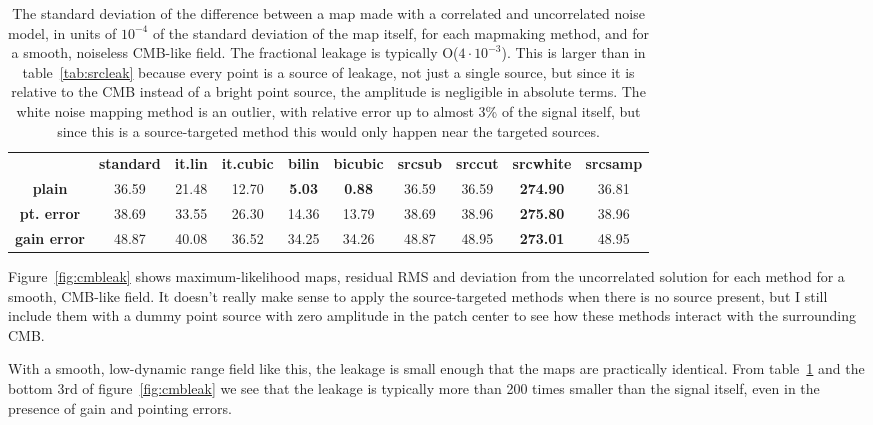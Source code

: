 \documentclass{article}
\newcommand{\good}[1]{{\color{deepgreen}\textbf{#1}}}
\newcommand{\bad}[1]{{\color{red}\textbf{#1}}}
\begin{document}
\begin{table}
	\centering
	\begin{tabular}{cccccccccc}
			&
			\bf standard &
			\bf it.lin &
			\bf it.cubic &
			\bf bilin &
			\bf bicubic &
			\bf srcsub &
			\bf srccut &
			\bf srcwhite &
			\bf srcsamp
		\\
			\bf plain &
			36.59 &
			21.48 &
			12.70 &
			\good{5.03} &
			\good{0.88} &
			36.59 &
			36.59 &
			\bad{274.90} &
			36.81
		\\
			\bf pt. error &
			38.69 &
			33.55 &
			26.30 &
			14.36 &
			13.79 &
			38.69 &
			38.96 &
			\bad{275.80} &
			38.96
		\\
			\bf gain error &
			48.87 &
			40.08 &
			36.52 &
			34.25 &
			34.26 &
			48.87 &
			48.95 &
			\bad{273.01} &
			48.95
	\end{tabular}
	\caption{The standard deviation of the difference between a map made with a correlated
		and uncorrelated noise model, in units of $10^{-4}$ of the standard deviation of the map itself, for each
		mapmaking method, and for a smooth, noiseless CMB-like field. The fractional leakage is typically
		O($4\cdot 10^{-3}$). This is larger than in table~\ref{tab:srcleak} because every point is a source of leakage, not just a single
		source, but since it is relative to the CMB instead of a bright point source, the amplitude is
		negligible in absolute terms. The white noise mapping method is an outlier, with relative
		error up to almost 3\% of the signal itself, but since this is a source-targeted method this would
		only happen near the targeted sources.}
	\label{tab:cmbleak}
\end{table}

Figure~\ref{fig:cmbleak} shows maximum-likelihood maps, residual RMS and deviation from the uncorrelated
solution for each method for a smooth, CMB-like field. It doesn't really make sense to apply
the source-targeted methods when there is no source present, but I still include them with
a dummy point source with zero amplitude in the patch center to see how these methods interact
with the surrounding CMB.

With a smooth, low-dynamic range field like this, the leakage is small
enough that the maps are practically identical. From table~\ref{tab:cmbleak} and the bottom
3rd of figure~\ref{fig:cmbleak} we see that the leakage is typically more than 200 times smaller than the
signal itself, even in the presence of gain and pointing errors.
\end{document}
